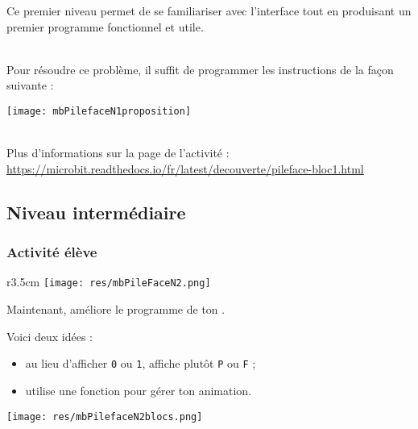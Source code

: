 Ce premier niveau permet de se familiariser avec l’interface tout en produisant un premier programme fonctionnel et utile.

\begin{minipage}[t]{0.5\linewidth}
    \begin{methode}~\\
    Pour résoudre ce problème, il suffit de programmer les instructions de la façon suivante :
    
    \texttt{[image: mbPilefaceN1proposition]}
    \end{methode}
\end{minipage}
\hfill
\begin{minipage}[t]{0.5\linewidth}
    \begin{remarque}~\\
    Plus d'informations sur la page de l'activité :\\ \url{https://microbit.readthedocs.io/fr/latest/decouverte/pileface-bloc1.html}
    \end{remarque}
\end{minipage}









%
%
\newpage
\subsection{Niveau intermédiaire}
\subsubsection{Activité élève}



\begin{wrapfigure}[4]{r}{3.5cm}
    \texttt{[image: res/mbPileFaceN2.png]}
\end{wrapfigure}
\begin{eleve}
Maintenant, {\Large{améliore}} le programme de ton \mb.

Voici deux idées :
\begin{itemize}
    \item au lieu d'afficher \texttt{0} ou \texttt{1}, affiche plutôt \texttt{P} ou \texttt{F} ;
    \item utilise une fonction pour gérer ton animation.
\end{itemize}
\texttt{[image: res/mbPilefaceN2blocs.png]}
\end{eleve}


